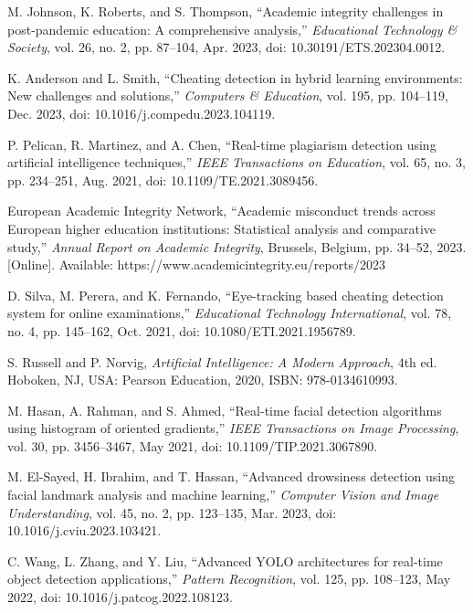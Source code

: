 \documentclass[conference]{IEEEtran}
\begin{document}
\begin{thebibliography}{99}

M. Johnson, K. Roberts, and S. Thompson, ``Academic integrity challenges in post-pandemic education: A comprehensive analysis,'' \textit{Educational Technology \& Society}, vol. 26, no. 2, pp. 87--104, Apr. 2023, doi: 10.30191/ETS.202304.0012.

K. Anderson and L. Smith, ``Cheating detection in hybrid learning environments: New challenges and solutions,'' \textit{Computers \& Education}, vol. 195, pp. 104--119, Dec. 2023, doi: 10.1016/j.compedu.2023.104119.

P. Pelican, R. Martinez, and A. Chen, ``Real-time plagiarism detection using artificial intelligence techniques,'' \textit{IEEE Transactions on Education}, vol. 65, no. 3, pp. 234--251, Aug. 2021, doi: 10.1109/TE.2021.3089456.

European Academic Integrity Network, ``Academic misconduct trends across European higher education institutions: Statistical analysis and comparative study,'' \textit{Annual Report on Academic Integrity}, Brussels, Belgium, pp. 34--52, 2023. [Online]. Available: https://www.academicintegrity.eu/reports/2023

D. Silva, M. Perera, and K. Fernando, ``Eye-tracking based cheating detection system for online examinations,'' \textit{Educational Technology International}, vol. 78, no. 4, pp. 145--162, Oct. 2021, doi: 10.1080/ETI.2021.1956789.

S. Russell and P. Norvig, \textit{Artificial Intelligence: A Modern Approach}, 4th ed. Hoboken, NJ, USA: Pearson Education, 2020, ISBN: 978-0134610993.

M. Hasan, A. Rahman, and S. Ahmed, ``Real-time facial detection algorithms using histogram of oriented gradients,'' \textit{IEEE Transactions on Image Processing}, vol. 30, pp. 3456--3467, May 2021, doi: 10.1109/TIP.2021.3067890.

M. El-Sayed, H. Ibrahim, and T. Hassan, ``Advanced drowsiness detection using facial landmark analysis and machine learning,'' \textit{Computer Vision and Image Understanding}, vol. 45, no. 2, pp. 123--135, Mar. 2023, doi: 10.1016/j.cviu.2023.103421.

C. Wang, L. Zhang, and Y. Liu, ``Advanced YOLO architectures for real-time object detection applications,'' \textit{Pattern Recognition}, vol. 125, pp. 108--123, May 2022, doi: 10.1016/j.patcog.2022.108123.


\end{thebibliography}
\end{document}
